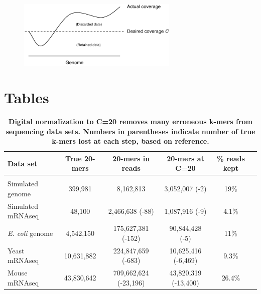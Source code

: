\documentclass{pnastwo}
\begin{document}
\begin{figure}
\centerline{\includegraphics[width=3in]{schematic.pdf}}
\caption{}
\label{fig:schematic}
\end{figure}

\section*{Tables}

\begin{table}[!ht]
\caption{
\bf{Digital normalization to C=20 removes many erroneous k-mers from sequencing data sets.  Numbers
in parentheses indicate number of true k-mers lost at each step, based on reference.}}
\begin{tabular}{|l|c|c|c|c|c|}
Data set & True 20-mers & 20-mers in reads & 20-mers at C=20 & \% reads kept\\
\hline \\
Simulated genome & 399,981 & 8,162,813 & 3,052,007 (-2) & 19\% \\
Simulated mRNAseq & 48,100 & 2,466,638 (-88) & 1,087,916 (-9) & 4.1\% \\
{\em E. coli} genome & 4,542,150 & 175,627,381 (-152) & 90,844,428 (-5) & 11\% \\
Yeast mRNAseq & 10,631,882 & 224,847,659 (-683) & 10,625,416 (-6,469) & 9.3\% \\
Mouse mRNAseq & 43,830,642 & 709,662,624 (-23,196) & 43,820,319 (-13,400) & 26.4\% \\
\end{tabular}
\begin{flushleft}
\end{flushleft}
\label{tab:normC20}
\end{table}


\end{document}
